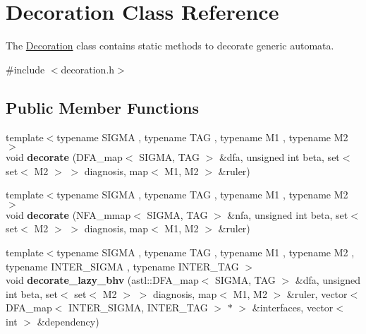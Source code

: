 \hypertarget{class_decoration}{}\section{Decoration Class Reference}
\label{class_decoration}


The \hyperlink{class_decoration}{Decoration} class contains static methods to decorate generic automata.  




{\ttfamily \#include $<$decoration.\+h$>$}

\subsection*{Public Member Functions}
\begin{DoxyCompactItemize}
\item 
{\footnotesize template$<$typename S\+I\+G\+MA , typename T\+AG , typename M1 , typename M2 $>$ }\\void {\bfseries decorate} (D\+F\+A\+\_\+map$<$ S\+I\+G\+MA, T\+AG $>$ \&dfa, unsigned int beta, set$<$ set$<$ M2 $>$ $>$ diagnosis, map$<$ M1, M2 $>$ \&ruler)\hypertarget{class_decoration_a3651b7d07d23ccdb2d54e295029515d9}{}\label{class_decoration_a3651b7d07d23ccdb2d54e295029515d9}

\item 
{\footnotesize template$<$typename S\+I\+G\+MA , typename T\+AG , typename M1 , typename M2 $>$ }\\void {\bfseries decorate} (N\+F\+A\+\_\+mmap$<$ S\+I\+G\+MA, T\+AG $>$ \&nfa, unsigned int beta, set$<$ set$<$ M2 $>$ $>$ diagnosis, map$<$ M1, M2 $>$ \&ruler)\hypertarget{class_decoration_a2d27d27a38dbc435ffa09916ed808a7b}{}\label{class_decoration_a2d27d27a38dbc435ffa09916ed808a7b}

\item 
{\footnotesize template$<$typename S\+I\+G\+MA , typename T\+AG , typename M1 , typename M2 , typename I\+N\+T\+E\+R\+\_\+\+S\+I\+G\+MA , typename I\+N\+T\+E\+R\+\_\+\+T\+AG $>$ }\\void {\bfseries decorate\+\_\+lazy\+\_\+bhv} (astl\+::\+D\+F\+A\+\_\+map$<$ S\+I\+G\+MA, T\+AG $>$ \&dfa, unsigned int beta, set$<$ set$<$ M2 $>$ $>$ diagnosis, map$<$ M1, M2 $>$ \&ruler, vector$<$ D\+F\+A\+\_\+map$<$ I\+N\+T\+E\+R\+\_\+\+S\+I\+G\+MA, I\+N\+T\+E\+R\+\_\+\+T\+AG $>$ $\ast$ $>$ \&interfaces, vector$<$ int $>$ \&dependency)\hypertarget{class_decoration_adab20531b8777e46f441590d61422fae}{}\label{class_decoration_adab20531b8777e46f441590d61422fae}

\end{DoxyCompactItemize}
